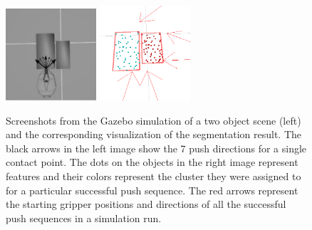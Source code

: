 \begin{figure}[h!]
  \begin{center}
    \includegraphics[width=0.3\textwidth]{figures/push_directions.pdf}  
    \includegraphics[width=0.3\textwidth]{figures/rviz_empty9_crop.pdf} 
    \caption[Screenshots from  the Gazebo  simulation of a  two object
      scene   and  the   corresponding  visualization   of  the
      segmentation result.]{Screenshots from  the Gazebo  simulation of a  two object
      scene (left)   and  the   corresponding  visualization   of  the
      segmentation result. The black arrows in the left image show the
      7 push  directions for a single  contact point. The  dots on the
      objects in  the right image represent features  and their colors
      represent  the cluster they  were assigned  to for  a particular
      successful push sequence. The red arrows represent the starting gripper positions
      and  directions  of  all  the  successful push  sequences  in  a
      simulation run. }
         \label{fig:simulations}
  \end{center}
\end{figure}

